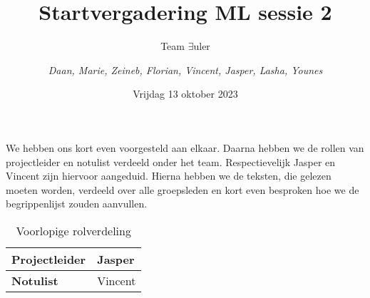 \documentclass{article}
\title{Startvergadering ML sessie 2}
\author{Team $\exists$uler \and
	\textit{Daan, Marie, Zeineb, Florian, Vincent, Jasper, Lasha, Younes}}
\date{Vrijdag 13 oktober 2023}
\begin{document}
	
	\maketitle
	
	We hebben ons kort even voorgesteld aan elkaar. Daarna hebben we de rollen van projectleider en notulist verdeeld onder het team. Respectievelijk Jasper en Vincent zijn hiervoor aangeduid. Hierna hebben we de teksten, die gelezen moeten worden, verdeeld over alle groepsleden en kort even besproken hoe we de begrippenlijst zouden aanvullen. \\
	
	\begin{table}
		\centering
		\begin{tabular}{l | l}
			\textbf{Projectleider} & Jasper \\ \hline
			\textbf{Notulist} & Vincent
		\end{tabular}
		\caption{Voorlopige rolverdeling}
	\end{table}

	
\end{document}
